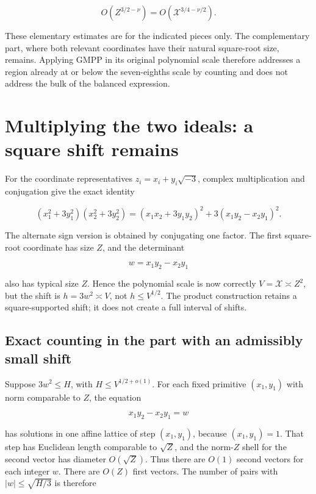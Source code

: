 \[
O(Z^{3/2-\nu})=O(\mathcal X^{3/4-\nu/2}).
\tag{14}
\]

These elementary estimates are for the indicated pieces only. The
complementary part, where both relevant coordinates have their natural
square-root size, remains. Applying GMPP in its original polynomial
scale therefore addresses a region already at or below the seven-eighths
scale by counting and does not address the bulk of the balanced
expression.

\section{Multiplying the two ideals: a square shift
remains}\label{multiplying-the-two-ideals-a-square-shift-remains}

For the coordinate representatives \(z_i=x_i+y_i\sqrt{-3}\), complex
multiplication and conjugation give the exact identity

\[
(x_1^2+3y_1^2)(x_2^2+3y_2^2)
=(x_1x_2+3y_1y_2)^2
 +3(x_1y_2-x_2y_1)^2.
\tag{15}
\]

The alternate sign version is obtained by conjugating one factor. The
first square-root coordinate has size \(Z\), and the determinant

\[
w=x_1y_2-x_2y_1
\]

also has typical size \(Z\). Hence the polynomial scale is now correctly
\(V=\mathcal X\asymp Z^2\), but the shift is \(h=3w^2\asymp V\), not
\(h\le V^{1/2}\). The product construction retains a square-supported
shift; it does not create a full interval of shifts.

\subsection{Exact counting in the part with an admissibly small
shift}\label{exact-counting-in-the-part-with-an-admissibly-small-shift}

Suppose \(3w^2\le H\), with \(H\le V^{1/2+o(1)}\). For each fixed
primitive \((x_1,y_1)\) with norm comparable to \(Z\), the equation

\[
x_1y_2-x_2y_1=w
\]

has solutions in one affine lattice of step \((x_1,y_1)\), because
\((x_1,y_1)=1\). That step has Euclidean length comparable to
\(\sqrt Z\), and the norm-\(Z\) shell for the second vector has diameter
\(O(\sqrt Z)\). Thus there are \(O(1)\) second vectors for each integer
\(w\). There are \(O(Z)\) first vectors. The number of pairs with
\(|w|\le\sqrt{H/3}\) is therefore

